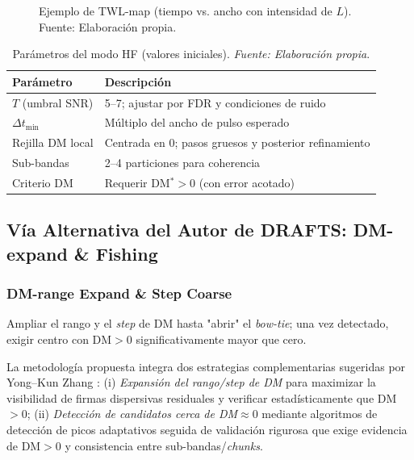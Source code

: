 \begin{figure}[h] 
\centering 
\caption{\label{fig:twl} Ejemplo de TWL-map (tiempo vs. ancho con intensidad de $L$). Fuente: Elaboración propia.} 
\end{figure}

\begin{table}[h]
  \centering
  \caption{\label{tab:param_hf} Parámetros del modo HF (valores iniciales). \textit{Fuente: Elaboración propia}.}
  \begin{tabular}{p{} p{}}
    \toprule
    \textbf{Parámetro} & \textbf{Descripción} \\
    \midrule
    $T$ (umbral SNR) & 5--7; ajustar por FDR y condiciones de ruido \\
    $\Delta t_{\min}$ & Múltiplo del ancho de pulso esperado \\
    Rejilla DM local & Centrada en 0; pasos gruesos y posterior refinamiento \\
    Sub-bandas & 2--4 particiones para coherencia \\
    Criterio DM & Requerir DM$^\ast>0$ (con error acotado) \\
    \bottomrule
  \end{tabular}
\end{table}

\subsection{Vía Alternativa del Autor de DRAFTS: DM-expand \& Fishing}

\subsubsection{DM-range Expand \& Step Coarse}

Ampliar el rango y el \textit{step} de DM hasta "abrir" el \textit{bow-tie}; una vez detectado, exigir centro con DM$>0$ significativamente mayor que cero.

La metodología propuesta integra dos estrategias complementarias sugeridas por Yong–Kun Zhang \cite{zhang2024drafts}: (i) \emph{Expansión del rango/step de DM} para maximizar la visibilidad de firmas dispersivas residuales y verificar estadísticamente que DM$>0$; (ii) \emph{Detección de candidatos cerca de DM$\approx 0$} mediante algoritmos de detección de picos adaptativos seguida de validación rigurosa que exige evidencia de DM$>0$ y consistencia entre sub-bandas/\emph{chunks}.

